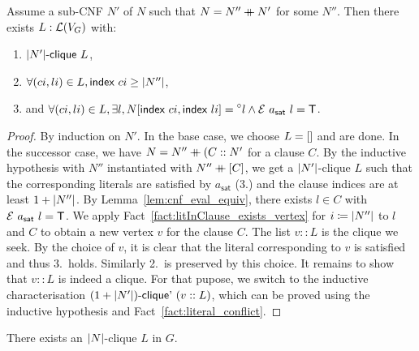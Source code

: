 \begin{lemma}
  Assume a sub-CNF $N'$ of $N$ such that $N = N'' \mathbin{+\mkern-10mu+} N'$ for some $N''$. Then there exists $L : \mathcal{L} (V_G)$ with: 
  \begin{enumerate}
    \item $\text{$|N'|$-\textsf{clique}}~L$, 
    \item $\forall (ci, li) \in L, \textsf{index}~ci \ge |N''|$, 
    \item and $\forall (ci, li) \in L, \exists l, N[\textsf{index}~ci, \textsf{index}~li] = \prescript{\circ}{}l \land \mathcal{E}~a_\textsf{sat}~l = \mathsf{T}$.
  \end{enumerate}
\end{lemma}
\begin{proof}
  By induction on $N'$. In the base case, we choose $L = []$ and are done. 
  In the successor case, we have $N = N'' \mathbin{+\mkern-10mu+} (C :: N'$ for a clause $C$. By the inductive hypothesis with $N''$ instantiated with $N'' \mathbin{+\mkern-10mu+} [C]$, we get a $|N'|$-clique $L$ such that the corresponding literals are satisfied by $a_\textsf{sat}$ (3.) and the clause indices are at least $1 +{|N''|}$. 
  By Lemma~\ref{lem:cnf_eval_equiv}, there exists $l \in C$ with $\mathcal{E}~a_{\textsf{sat}}~l = \mathsf{T}$. 
  We apply Fact~\ref{fact:litInClause_exists_vertex} for $i \coloneqq |N''|$ to $l$ and $C$ to obtain a new vertex $v$ for the clause $C$. 
  The list $v :: L$ is the clique we seek. By the choice of $v$, it is clear that the literal corresponding to $v$ is satisfied and thus 3.\ holds. Similarly 2.\ is preserved by this choice. 
  It remains to show that $v :: L$ is indeed a clique. For that pupose, we switch to the inductive characterisation $\text{$(1 +{|N'|})$-\textsf{clique}'}~(v :: L)$, which can be proved using the inductive hypothesis and Fact~\ref{fact:literal_conflict}.
\end{proof}

\begin{corollary}
  There exists an $|N|$-clique $L$ in $G$.
\end{corollary}

